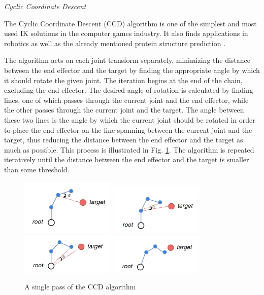 \noindent\textit{Cyclic Coordinate Descent}

The Cyclic Coordinate Descent (CCD) algorithm \cite{ccd} is one of the simplest and most
used IK solutions in the computer games industry. It also finds
applications in robotics as well as the already mentioned protein structure
prediction \cite{ccd_protein}. 

The algorithm acts on each joint transform separately, minimizing the distance
between the end effector and the target by finding the appropriate angle by
which it should rotate the given joint. The iteration begins at the end of the
chain, excluding the end effector. The desired angle of rotation is calculated by
finding lines, one of which passes through the current joint and the end
effector, while the other passes through the current joint and the target. The
angle between these two lines is the angle by which the current joint should
be rotated in order to place the end effector on the line spanning between the
current joint and the target, thus reducing the distance between the end
effector and the target as much as possible. This process is illustrated in Fig.
\ref{fig:ccd}. The algorithm is repeated iteratively until the distance between the end
effector and the target is smaller than some threshold.

\begin{figure}
    \centering
    \captionsetup{justification=centering}
    \includegraphics[width=0.4\textwidth]{grafika/ccd_1}
    \includegraphics[width=0.4\textwidth]{grafika/ccd_2}
    \includegraphics[width=0.4\textwidth]{grafika/ccd_3}
    \includegraphics[width=0.4\textwidth]{grafika/ccd_4}
    \caption{A single pass of the CCD algorithm}
    \label{fig:ccd}
\end{figure}

